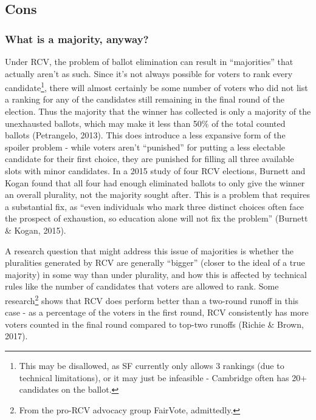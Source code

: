 \documentclass[12pt,twoside]{reedthesis}
\begin{document}
\hypertarget{cons}{%
\subsection{Cons}\label{cons}}

\hypertarget{what-is-a-majority-anyway}{%
\subsubsection{What is a majority, anyway?}\label{what-is-a-majority-anyway}}

Under RCV, the problem of ballot elimination can result in ``majorities'' that actually aren't as such. Since it's not always possible for voters to rank every candidate\footnote{This may be disallowed, as SF currently only allows 3 rankings (due to technical limitations), or it may just be infeasible - Cambridge often has 20+ candidates on the ballot.}, there will almost certainly be some number of voters who did not list a ranking for any of the candidates still remaining in the final round of the election. Thus the majority that the winner has collected is only a majority of the unexhausted ballots, which may make it less than 50\% of the total counted ballots (Petrangelo, 2013). This does introduce a less expansive form of the spoiler problem - while voters aren't ``punished'' for putting a less electable candidate for their first choice, they are punished for filling all three available slots with minor candidates. In a 2015 study of four RCV elections, Burnett and Kogan found that all four had enough eliminated ballots to only give the winner an overall plurality, not the majority sought after. This is a problem that requires a substantial fix, as ``even individuals who mark three distinct choices often face the prospect of exhaustion, so education alone will not fix the problem'' (Burnett \& Kogan, 2015).

A research question that might address this issue of majorities is whether the pluralities generated by RCV are generally ``bigger'' (closer to the ideal of a true majority) in some way than under plurality, and how this is affected by technical rules like the number of candidates that voters are allowed to rank. Some research\footnote{From the pro-RCV advocacy group FairVote, admittedly.} shows that RCV does perform better than a two-round runoff in this case - as a percentage of the voters in the first round, RCV consistently has more voters counted in the final round compared to top-two runoffs (Richie \& Brown, 2017).
\end{document}
